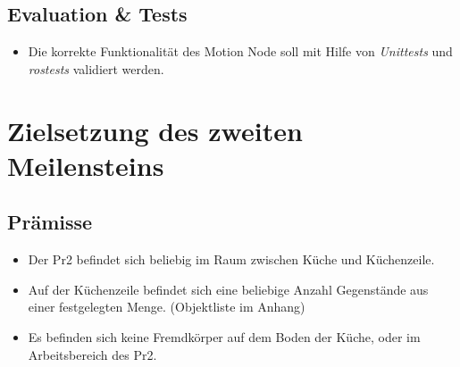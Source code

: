 \documentclass{suturo}
\begin{document}
\subsection*{Evaluation \& Tests}
\begin{itemize}
\item Die korrekte Funktionalität des Motion Node soll mit Hilfe von \textit{Unittests} und \textit{rostests} validiert werden.
\end{itemize}

\newpage

\section{Zielsetzung des zweiten Meilensteins}
\subsection{Prämisse}
\begin{itemize}
\item Der Pr2 befindet sich beliebig im Raum zwischen Küche und Küchenzeile.
\item Auf der Küchenzeile befindet sich eine beliebige Anzahl Gegenstände aus einer festgelegten Menge. (Objektliste im Anhang)
\item Es befinden sich keine Fremdkörper auf dem Boden der Küche, oder im Arbeitsbereich des Pr2.
\end{itemize}
\end{document}

